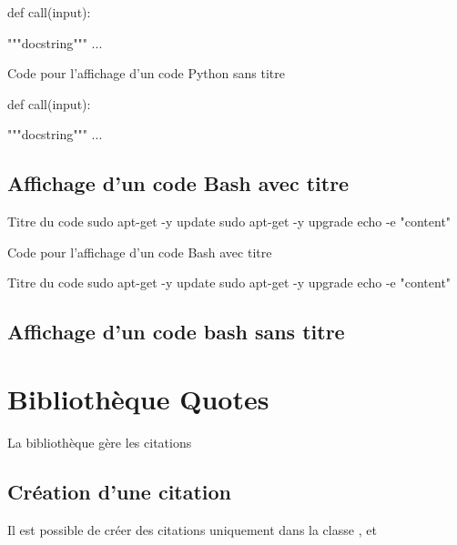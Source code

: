 {\begin{Python}
def call(input):

  """docstring"""
  ...
\end{Python}

\begin{Latex}{Code pour l'affichage d'un code Python sans titre}
  \begin{Python}
    def call(input):
    
      """docstring"""
      ...
    \end{Python}
\end{Latex}


\section{Affichage d'un code Bash avec titre}


\begin{Bash}{Titre du code}
sudo apt-get -y update
sudo apt-get -y upgrade
echo -e "content"
\end{Bash}

\begin{Latex}{Code pour l'affichage d'un code Bash avec titre}
  \begin{Bash}{Titre du code}
    sudo apt-get -y update
    sudo apt-get -y upgrade
    echo -e "content"
    \end{Bash}
\end{Latex}

\section{Affichage d'un code bash sans titre}



\chapter{Bibliothèque Quotes}

La bibliothèque  gère les citations

\section{Création d'une citation}

Il est possible de créer des citations uniquement dans la classe ,  et 

}
